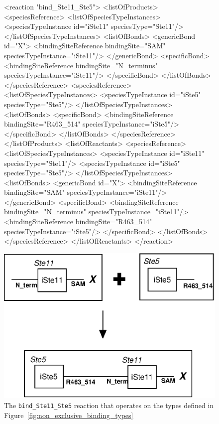 \documentclass{cekarticle}
\begin{document}
\begin{figure}[h]
\begin{example}
<reaction "bind_Ste11_Ste5">
    <listOfProducts>
        <speciesReference>
            <listOfSpeciesTypeInstances>
                <speciesTypeInstance id="iSte11" speciesType="Ste11"/>
            </listOfSpeciesTypeInstances>
            <listOfBonds>
                <genericBond id="X">
                    <bindingSiteReference bindingSite="SAM" speciesTypeInstance="iSte11"/>
                </genericBond>
                <specificBond>
                    <bindingSiteReference bindingSite="N_terminus" speciesTypeInstance="iSte11"/>
                </specificBond>
            </listOfBonds>
        </speciesReference>
        <speciesReference>
            <listOfSpeciesTypeInstances>
                <speciesTypeInstance id="iSte5" speciesType="Ste5"/>
            </listOfSpeciesTypeInstances>
            <listOfBonds>
                <specificBond>
                    <bindingSiteReference bindingSite="R463_514" speciesTypeInstance="iSte5"/>
                </specificBond>
            </listOfBonds>
        </speciesReference>
    </listOfProducts>
    <listOfReactants>
        <speciesReference>
            <listOfSpeciesTypeInstances>
                <speciesTypeInstance id="iSte11" speciesType="Ste11"/>
                <speciesTypeInstance id="iSte5" speciesType="Ste5"/>
            </listOfSpeciesTypeInstances>
            <listOfBonds>
                <genericBond id="X">
                    <bindingSiteReference bindingSite="SAM" speciesTypeInstance="iSte11"/>
                </genericBond>
                <specificBond>
                    <bindingSiteReference bindingSite="N_terminus" speciesTypeInstance="iSte11"/>
                    <bindingSiteReference bindingSite="R463_514" speciesTypeInstance="iSte5"/>
                </specificBond>
            </listOfBonds>
        </speciesReference>
    </listOfReactants>
</reaction>
\end{example}
  \vspace*{8pt}
  \centering
  \includegraphics[scale = 0.7]{bind_Ste11_Ste5.eps}
  \caption{The \texttt{bind\_Ste11\_Ste5} reaction that operates on the types defined in
  Figure~\ref{fig:non_exclusive_binding_types}}
  \label{fig:bind_Ste11_Ste5}
\end{figure}
\end{document}
